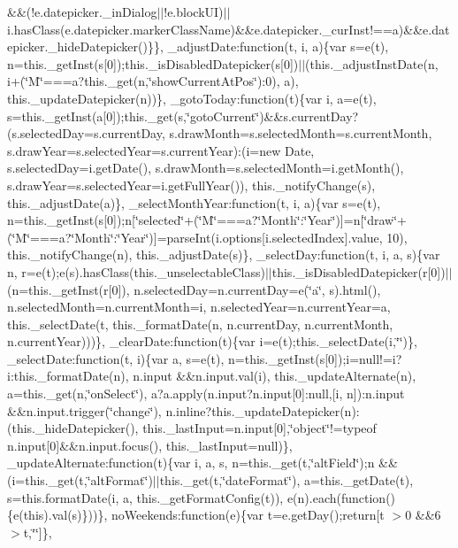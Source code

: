 {{\begin{DoxyParamCaption}
\&\&(!e.\+datepicker.\+\_\+in\+Dialog$\vert$$\vert$!e.\+block\+U\+I)$\vert$$\vert$i.\+has\+Class(e.\+datepicker.\+marker\+Class\+Name)\&\&e.\+datepicker.\+\_\+cur\+Inst!==a)\&\&e.\+datepicker.\+\_\+hide\+Datepicker()\}\}, \+\_\+adjust\+Date\+:function(t, i, a)\{var s=e(t), n=this.\+\_\+get\+Inst(s\mbox{[}0\mbox{]});this.\+\_\+is\+Disabled\+Datepicker(s\mbox{[}0\mbox{]})$\vert$$\vert$(this.\+\_\+adjust\+Inst\+Date(n, i+(\char`\"{}\+M\char`\"{}===a?this.\+\_\+get(n,\char`\"{}show\+Current\+At\+Pos\char`\"{})\+:0), a), this.\+\_\+update\+Datepicker(n))\}, \+\_\+goto\+Today\+:function(t)\{var i, a=e(t), s=this.\+\_\+get\+Inst(a\mbox{[}0\mbox{]});this.\+\_\+get(s,\char`\"{}goto\+Current\char`\"{})\&\&s.\+current\+Day?(s.\+selected\+Day=s.\+current\+Day, s.\+draw\+Month=s.\+selected\+Month=s.\+current\+Month, s.\+draw\+Year=s.\+selected\+Year=s.\+current\+Year)\+:(i=new Date, s.\+selected\+Day=i.\+get\+Date(), s.\+draw\+Month=s.\+selected\+Month=i.\+get\+Month(), s.\+draw\+Year=s.\+selected\+Year=i.\+get\+Full\+Year()), this.\+\_\+notify\+Change(s), this.\+\_\+adjust\+Date(a)\}, \+\_\+select\+Month\+Year\+:function(t, i, a)\{var s=e(t), n=this.\+\_\+get\+Inst(s\mbox{[}0\mbox{]});n\mbox{[}\char`\"{}selected\char`\"{}+(\char`\"{}\+M\char`\"{}===a?\char`\"{}\+Month\char`\"{}\+:\char`\"{}\+Year\char`\"{})\mbox{]}=n\mbox{[}\char`\"{}draw\char`\"{}+(\char`\"{}\+M\char`\"{}===a?\char`\"{}\+Month\char`\"{}\+:\char`\"{}\+Year\char`\"{})\mbox{]}=parse\+Int(i.\+options\mbox{[}i.\+selected\+Index\mbox{]}.\+value, 10), this.\+\_\+notify\+Change(n), this.\+\_\+adjust\+Date(s)\}, \+\_\+select\+Day\+:function(t, i, a, s)\{var n, r=e(t);e(s).\+has\+Class(this.\+\_\+unselectable\+Class)$\vert$$\vert$this.\+\_\+is\+Disabled\+Datepicker(r\mbox{[}0\mbox{]})$\vert$$\vert$(n=this.\+\_\+get\+Inst(r\mbox{[}0\mbox{]}), n.\+selected\+Day=n.\+current\+Day=e(\char`\"{}a\char`\"{}, s).\+html(), n.\+selected\+Month=n.\+current\+Month=i, n.\+selected\+Year=n.\+current\+Year=a, this.\+\_\+select\+Date(t, this.\+\_\+format\+Date(n, n.\+current\+Day, n.\+current\+Month, n.\+current\+Year)))\}, \+\_\+clear\+Date\+:function(t)\{var i=e(t);this.\+\_\+select\+Date(i,\char`\"{}\char`\"{})\}, \+\_\+select\+Date\+:function(t, i)\{var a, s=e(t), n=this.\+\_\+get\+Inst(s\mbox{[}0\mbox{]});i=null!=i?i\+:this.\+\_\+format\+Date(n), n.\+input \&\&n.\+input.\+val(i), this.\+\_\+update\+Alternate(n), a=this.\+\_\+get(n,\char`\"{}on\+Select\char`\"{}), a?a.\+apply(n.\+input?n.\+input\mbox{[}0\mbox{]}\+:null,\mbox{[}i, n\mbox{]})\+:n.\+input \&\&n.\+input.\+trigger(\char`\"{}change\char`\"{}), n.\+inline?this.\+\_\+update\+Datepicker(n)\+:(this.\+\_\+hide\+Datepicker(), this.\+\_\+last\+Input=n.\+input\mbox{[}0\mbox{]},\char`\"{}object\char`\"{}!=typeof n.\+input\mbox{[}0\mbox{]}\&\&n.\+input.\+focus(), this.\+\_\+last\+Input=null)\}, \+\_\+update\+Alternate\+:function(t)\{var i, a, s, n=this.\+\_\+get(t,\char`\"{}alt\+Field\char`\"{});n \&\&(i=this.\+\_\+get(t,\char`\"{}alt\+Format\char`\"{})$\vert$$\vert$this.\+\_\+get(t,\char`\"{}date\+Format\char`\"{}), a=this.\+\_\+get\+Date(t), s=this.\+format\+Date(i, a, this.\+\_\+get\+Format\+Config(t)), e(n).\+each(function()\{e(this).\+val(s)\}))\}, no\+Weekends\+:function(e)\{var t=e.\+get\+Day();return\mbox{[}t $>$0 \&\&6 $>$t,\char`\"{}\char`\"{}\mbox{]}\}, 
\end{DoxyParamCaption}}}
